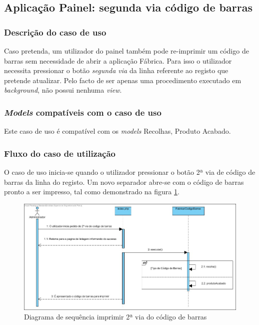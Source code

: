 \subsection{Aplicação Painel: segunda via código de barras}
\subsubsection*{Descrição do caso de uso}
Caso pretenda, um utilizador do painel também pode re-imprimir um código de barras sem necessidade de abrir a aplicação Fábrica. Para isso o utilizador necessita pressionar o botão\textit{ segunda via} da linha referente ao registo que pretende atualizar. Pelo facto de ser apenas uma procedimento executado em \textit{background}, não possui nenhuma \textit{view}.

\subsubsection*{\textit{Models} compatíveis com o caso de uso}
Este caso de uso é compatível com os \textit{models} Recolhas, Produto Acabado.

\subsubsection*{Fluxo do caso de utilização}
O caso de uso inicia-se quando o utilizador pressionar o botão 2ª via de código de barras da linha do registo. Um novo separador abre-se com o código de barras pronto a ser impresso, tal como demonstrado na figura \ref{fig:sd_2_via_painel}.


\begin{figure}[H] 
	\begin{center}
		\includegraphics[width=\textwidth,keepaspectratio]{figuras/Diagramas_vp/SD_Painel_6_2_via_Codigo_de_Barras.jpg}
		\caption{Diagrama de sequência imprimir 2ª via do código de barras}
		\label{fig:sd_2_via_painel} 
	\end{center}
\end{figure}